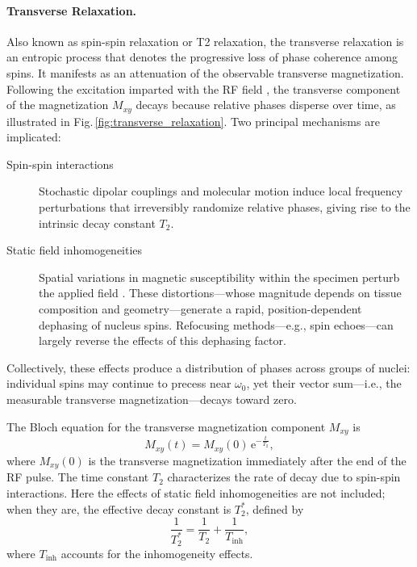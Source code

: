 \paragraph{Transverse Relaxation.}
Also known as spin-spin relaxation or T2 relaxation, the transverse relaxation is an entropic process that denotes the progressive loss of phase coherence among spins. It manifests as an attenuation of the observable transverse magnetization. Following the excitation imparted with the RF field , the transverse component of the magnetization $M_{xy}$ decays because relative phases disperse over time, as illustrated in Fig.\,\ref{fig:transverse_relaxation}. Two principal mechanisms are implicated:
\begin{description}
  \item[Spin-spin interactions] Stochastic dipolar couplings and molecular motion induce local frequency perturbations that irreversibly randomize relative phases, giving rise to the intrinsic decay constant $T_2$.
  \item[Static field inhomogeneities] Spatial variations in magnetic susceptibility within the specimen perturb the applied field . These distortions---whose magnitude depends on tissue composition and geometry---generate a rapid, position-dependent dephasing of nucleus spins. Refocusing methods---e.g., spin echoes---can largely reverse the effects of this dephasing factor.
\end{description}
Collectively, these effects produce a distribution of phases across groups of nuclei: individual spins may continue to precess near $\omega_0$, yet their vector sum---i.e., the measurable transverse magnetization---decays toward zero.

The Bloch equation for the transverse magnetization component $M_{xy}$ is
\begin{equation}
  M_{xy}(t) = M_{xy}(0)\,\mathrm{e}^{-\frac{t}{T_2}},
\end{equation}
where $M_{xy}(0)$ is the transverse magnetization immediately after the end of the RF pulse. The time constant $T_2$ characterizes the rate of decay due to spin-spin interactions. Here the effects of static field inhomogeneities are not included; when they are, the effective decay constant is $T_2^*$, defined by
\begin{equation}
    \frac{1}{T_2^*} = \frac{1}{T_2} + \frac{1}{T_\text{inh}},
\end{equation}
where $T_\text{inh}$ accounts for the inhomogeneity effects.

